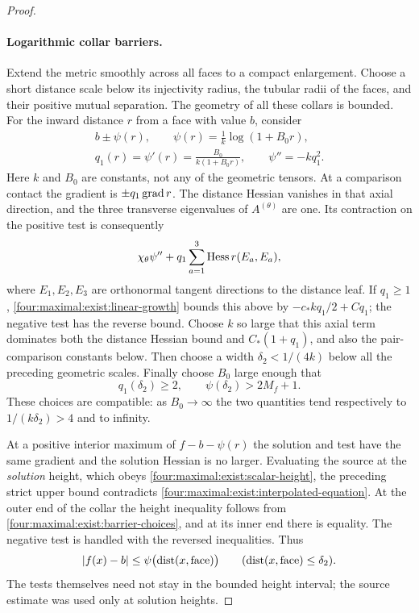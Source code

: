 \begin{proof}
\paragraph{Logarithmic collar barriers.}
Extend the metric smoothly across all faces to a compact enlargement.
Choose a short distance scale below its injectivity radius, the tubular
radii of the faces, and their positive mutual separation.  The geometry
of all these collars is bounded.  For the inward distance $r$ from a
face with value $b$, consider
\begin{equation}\label{four:maximal:exist:log-barrier}
\begin{gathered}
 b\pm\psi(r),\qquad
 \psi(r)=\frac1k\log(1+B_0r),\\
 q_1(r)=\psi'(r)=\frac{B_0}{k(1+B_0r)},\qquad
 \psi''=-kq_1^2.
\end{gathered}
\end{equation}
Here $k$ and $B_0$ are constants, not any of the geometric tensors.
At a comparison contact the gradient is $\pm q_1\operatorname{grad} r$.
The distance Hessian vanishes in that axial direction, and the three
transverse eigenvalues of $A^{(\theta)}$ are one.  Its contraction on
the positive test is consequently
\[
 \chi_\theta\psi''+
      q_1\sum_{a=1}^3\operatorname{Hess} r(E_a,E_a),
\]
where $E_1,E_2,E_3$ are orthonormal tangent directions to the distance
leaf.  If $q_1\ge1$, \eqref{four:maximal:exist:linear-growth} bounds this above by
$-c_*kq_1/2+Cq_1$; the negative test has the reverse bound.
Choose $k$ so large that this axial term dominates both the distance
Hessian bound and $C_*(1+q_1)$, and also the pair-comparison constants
below.  Then choose a width $\delta_2<1/(4k)$ below all the preceding
geometric scales.  Finally choose $B_0$ large enough that
\begin{equation}\label{four:maximal:exist:barrier-choices}
 q_1(\delta_2)\ge2,\qquad \psi(\delta_2)>2M_f+1.
\end{equation}
These choices are compatible: as $B_0\to\infty$ the two quantities
tend respectively to $1/(k\delta_2)>4$ and to infinity.

At a positive interior maximum of $f-b-\psi(r)$ the solution and test
have the same gradient and the solution Hessian is no larger.  Evaluating
the source at the \emph{solution} height, which obeys
\eqref{four:maximal:exist:scalar-height}, the preceding strict upper bound
contradicts \eqref{four:maximal:exist:interpolated-equation}.
At the outer end of the collar the height inequality follows from
\eqref{four:maximal:exist:barrier-choices}, and at its inner end there is equality.
The negative test is handled with the reversed inequalities.  Thus
\begin{equation}\label{four:maximal:exist:collar-comparison}
 |f(x)-b|\le\psi\bigl(\operatorname{dist}(x,\text{face})\bigr)
       \qquad (\operatorname{dist}(x,\text{face})\le\delta_2).
\end{equation}
The tests themselves need not stay in the bounded height interval;
the source estimate was used only at solution heights.


\end{proof}
